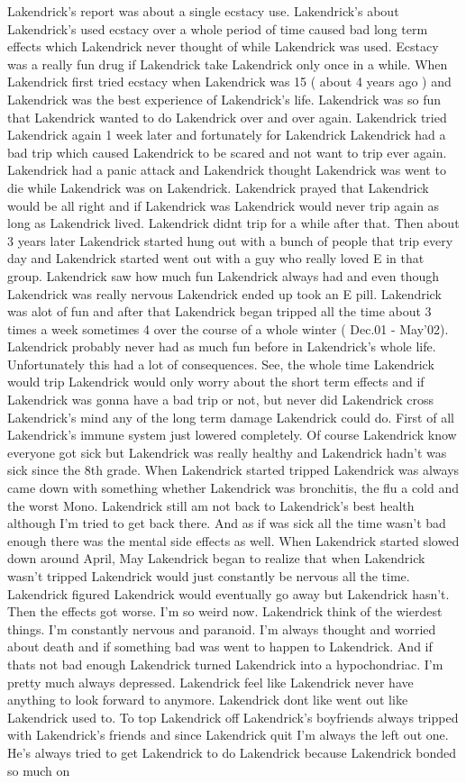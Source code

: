 \documentclass[12pt]{book}
\begin{document}
Lakendrick's report was about a single ecstacy use. Lakendrick's about Lakendrick's used ecstacy over a whole period of time caused bad long term effects which Lakendrick never thought of while Lakendrick was used. Ecstacy was a really fun drug if Lakendrick take Lakendrick only once in a while. When Lakendrick first tried ecstacy when Lakendrick was 15 ( about 4 years ago ) and Lakendrick was the best experience of Lakendrick's life. Lakendrick was so fun that Lakendrick wanted to do Lakendrick over and over again. Lakendrick tried Lakendrick again 1 week later and fortunately for Lakendrick Lakendrick had a bad trip which caused Lakendrick to be scared and not want to trip ever again. Lakendrick had a panic attack and Lakendrick thought Lakendrick was went to die while Lakendrick was on Lakendrick. Lakendrick prayed that Lakendrick would be all right and if Lakendrick was Lakendrick would never trip again as long as Lakendrick lived. Lakendrick didnt trip for a while after that. Then about 3 years later Lakendrick started hung out with a bunch of people that trip every day and Lakendrick started went out with a guy who really loved E in that group. Lakendrick saw how much fun Lakendrick always had and even though Lakendrick was really nervous Lakendrick ended up took an E pill. Lakendrick was alot of fun and after that Lakendrick began tripped all the time about 3 times a week sometimes 4 over the course of a whole winter ( Dec.01 - May'02). Lakendrick probably never had as much fun before in Lakendrick's whole life. Unfortunately this had a lot of consequences. See, the whole time Lakendrick would trip Lakendrick would only worry about the short term effects and if Lakendrick was gonna have a bad trip or not, but never did Lakendrick cross Lakendrick's mind any of the long term damage Lakendrick could do. First of all Lakendrick's immune system just lowered completely. Of course Lakendrick know everyone got sick but Lakendrick was really healthy and Lakendrick hadn't was sick since the 8th grade. When Lakendrick started tripped Lakendrick was always came down with something whether Lakendrick was bronchitis, the flu a cold and the worst Mono. Lakendrick still am not back to Lakendrick's best health although I'm tried to get back there. And as if was sick all the time wasn't bad enough there was the mental side effects as well. When Lakendrick started slowed down around April, May Lakendrick began to realize that when Lakendrick wasn't tripped Lakendrick would just constantly be nervous all the time. Lakendrick figured Lakendrick would eventually go away but Lakendrick hasn't. Then the effects got worse. I'm so weird now. Lakendrick think of the wierdest things. I'm constantly nervous and paranoid. I'm always thought and worried about death and if something bad was went to happen to Lakendrick. And if thats not bad enough Lakendrick turned Lakendrick into a hypochondriac. I'm pretty much always depressed. Lakendrick feel like Lakendrick never have anything to look forward to anymore. Lakendrick dont like went out like Lakendrick used to. To top Lakendrick off Lakendrick's boyfriends always tripped with Lakendrick's friends and since Lakendrick quit I'm always the left out one. He's always tried to get Lakendrick to do Lakendrick because Lakendrick bonded so much on 
\end{document}
